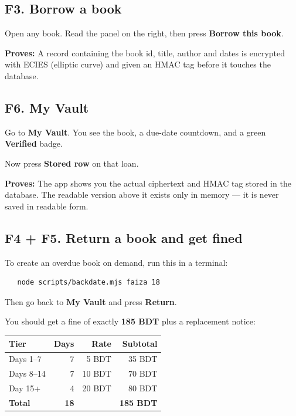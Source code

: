 \documentclass[11pt]{article}
\newcommand{\proof}[1]{\textcolor{ok}{\textbf{Proves:}} #1}
\begin{document}
\subsection*{F3. Borrow a book}

Open any book. Read the panel on the right, then press \textbf{Borrow this book}.

\proof{A record containing the book id, title, author and dates is encrypted
with ECIES (elliptic curve) and given an HMAC tag before it touches the
database.}

\subsection*{F6. My Vault}

Go to \textbf{My Vault}. You see the book, a due-date countdown, and a green
\textbf{Verified} badge.

Now press \textbf{Stored row} on that loan.

\proof{The app shows you the actual ciphertext and HMAC tag stored in the
database. The readable version above it exists only in memory --- it is never
saved in readable form.}

\subsection*{F4 + F5. Return a book and get fined}

To create an overdue book on demand, run this in a terminal:

\begin{verbatim}
   node scripts/backdate.mjs faiza 18
\end{verbatim}

Then go back to \textbf{My Vault} and press \textbf{Return}.

You should get a fine of exactly \textbf{185 BDT} plus a replacement notice:

\begin{center}
\begin{tabular}{lrrr}
\toprule
\textbf{Tier} & \textbf{Days} & \textbf{Rate} & \textbf{Subtotal} \\
\midrule
Days 1--7   & 7 & 5 BDT  & 35 BDT \\
Days 8--14  & 7 & 10 BDT & 70 BDT \\
Day 15+     & 4 & 20 BDT & 80 BDT \\
\midrule
\textbf{Total} & \textbf{18} & & \textbf{185 BDT} \\
\bottomrule
\end{tabular}
\end{center}
\end{document}
